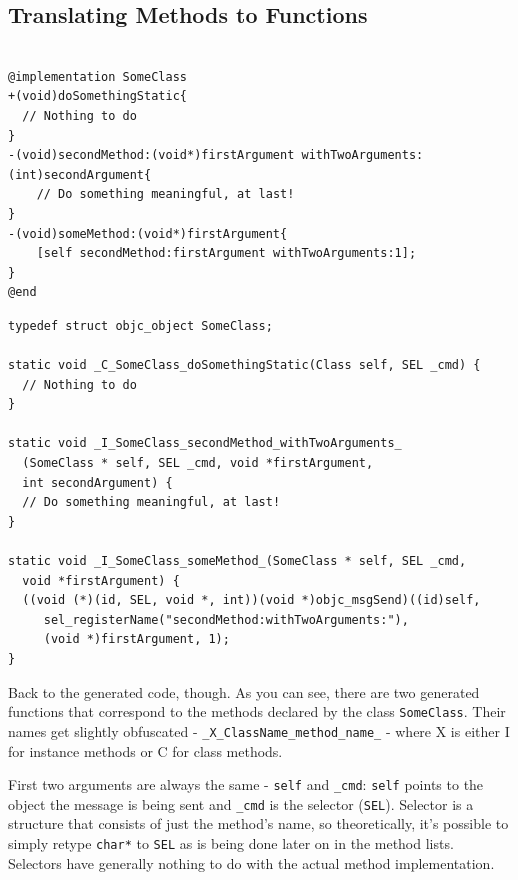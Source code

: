 \documentclass[a4paper, 11pt, fleqn]{book}
\begin{document}
\subsection{Translating Methods to Functions}



\begin{verbatim}

@implementation SomeClass
+(void)doSomethingStatic{
  // Nothing to do
}
-(void)secondMethod:(void*)firstArgument withTwoArguments:(int)secondArgument{
    // Do something meaningful, at last!
}
-(void)someMethod:(void*)firstArgument{
    [self secondMethod:firstArgument withTwoArguments:1];
}
@end

\end{verbatim}

\begin{verbatim}
typedef struct objc_object SomeClass;

static void _C_SomeClass_doSomethingStatic(Class self, SEL _cmd) {
  // Nothing to do
}

static void _I_SomeClass_secondMethod_withTwoArguments_
  (SomeClass * self, SEL _cmd, void *firstArgument, 
  int secondArgument) {
  // Do something meaningful, at last!
}

static void _I_SomeClass_someMethod_(SomeClass * self, SEL _cmd, 
  void *firstArgument) {
  ((void (*)(id, SEL, void *, int))(void *)objc_msgSend)((id)self,
     sel_registerName("secondMethod:withTwoArguments:"), 
     (void *)firstArgument, 1);
}

\end{verbatim}


Back to the generated code, though. As you can see, there are two generated functions that correspond to the methods declared by the class \verb=SomeClass=. Their names get slightly obfuscated - \verb=_X_ClassName_method_name_= - where X is either I for instance methods or C for class methods.

First two arguments are always the same - \verb=self= and \verb=_cmd=: \verb=self= points to the object the message is being sent and \verb=_cmd= is the selector (\verb=SEL=). Selector is a structure that consists of just the method's name, so theoretically, it's possible to simply retype \verb=char*= to \verb=SEL= as is being done later on in the method lists. Selectors have generally nothing to do with the actual method implementation.
\end{document}
